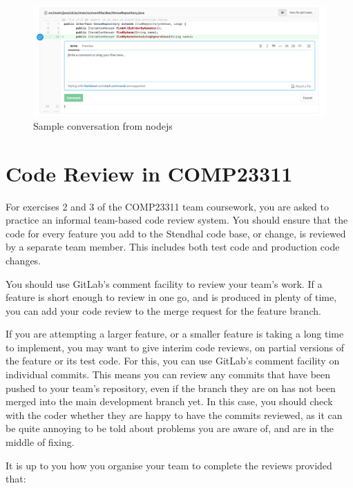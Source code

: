 \documentclass[
]{book}
\begin{document}
\begin{figure}

{\centering \includegraphics[width=1\linewidth]{images/comment_commit} 

}

\caption{Sample conversation from nodejs}\label{fig:comment-commit-fig}
\end{figure}

\hypertarget{crcourse}{%
\section{Code Review in COMP23311}\label{crcourse}}

For exercises 2 and 3 of the COMP23311 team coursework, you are asked to practice an informal team-based code review system. You should ensure that the code for every feature you add to the Stendhal code base, or change, is reviewed by a separate team member. This includes both test code and production code changes.

You should use GitLab's comment facility to review your team's work. If a feature is short enough to review in one go, and is produced in plenty of time, you can add your code review to the merge request for the feature branch.

If you are attempting a larger feature, or a smaller feature is taking a long time to implement, you may want to give interim code reviews, on partial versions of the feature or its test code. For this, you can use GitLab's comment facility on individual commits. This means you can review any commits that have been pushed to your team's repository, even if the branch they are on has not been merged into the main development branch yet. In this case, you should check with the coder whether they are happy to have the commits reviewed, as it can be quite annoying to be told about problems you are aware of, and are in the middle of fixing.

It is up to you how you organise your team to complete the reviews provided that:
\end{document}
